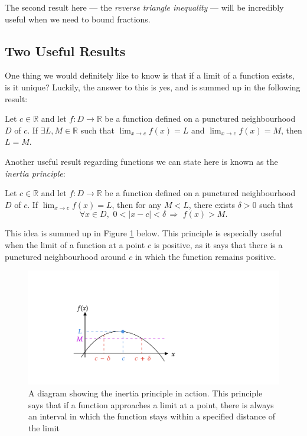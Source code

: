 \documentclass[
  17pt,
  a4paper]{extarticle}
\theoremstyle{plain}
\theoremstyle{definition}
\theoremstyle{plain}
\theoremstyle{plain}
\theoremstyle{plain}
\theoremstyle{plain}
\theoremstyle{definition}
\theoremstyle{definition}
\theoremstyle{remark}
\theoremstyle{remark}
\let\BeginKnitrBlock\begin \let\EndKnitrBlock\end
\renewcommand{\;}{\,}
\begin{document}
The second result here --- the \emph{reverse triangle inequality} --- will be incredibly useful when we need to bound fractions.

\hypertarget{two-useful-results}{%
\subsection{Two Useful Results}\label{two-useful-results}}

One thing we would definitely like to know is that if a limit of a function exists, is it unique? Luckily, the answer to this is yes, and is summed up in the following result:
\BeginKnitrBlock{proposition}[Uniqueness of Limits]
{\label{prp:prop1} }Let \(c\in\mathbb{R}\) and let \(f:D \to \mathbb{R}\) be a function defined on a punctured neighbourhood \(D\) of \(c\). If \(\exists L, M \in \mathbb{R}\) such that \(\lim_{x\to c} f(x) = L\) and \(\lim_{x\to c} f(x) = M\), then \(L=M\).
\EndKnitrBlock{proposition}

Another useful result regarding functions we can state here is known as the \emph{inertia principle}:
\BeginKnitrBlock{proposition}[Inertia]
{\label{prp:prop2} }Let \(c\in\mathbb{R}\) and let \(f:D \to \mathbb{R}\) be a function defined on a punctured neighbourhood \(D\) of \(c\). If \(\lim_{x\to c} f(x) = L\), then for any \(M < L\), there exists \(\delta > 0\) such that \[\forall x \in D,\;\; 0 < \lvert x - c \rvert < \delta \; \Rightarrow \;\; f(x) > M.\]
\EndKnitrBlock{proposition}
This idea is summed up in Figure \ref{fig:inertia} below. This principle is especially useful when the limit of a function at a point \(c\) is positive, as it says that there is a punctured neighbourhood around \(c\) in which the function remains positive.

\begin{figure}
\includegraphics[width=\Width,height=\Height]{Inertia} \caption{A diagram showing the inertia principle in action. This principle says that if a function approaches a limit at a point, there is always an interval in which the function stays within a specified distance of the limit}\label{fig:inertia}
\end{figure}
\end{document}
